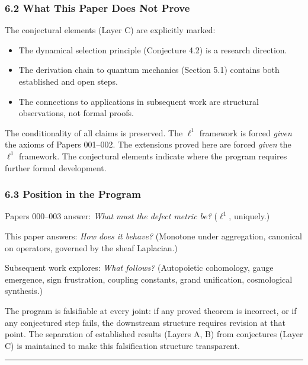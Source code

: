 \documentclass[
]{article}
\providecommand{\tightlist}{%
  \setlength{\itemsep}{0pt}\setlength{\parskip}{0pt}}
\begin{document}
\subsubsection{6.2 What This Paper Does Not
Prove}\label{what-this-paper-does-not-prove}

The conjectural elements (Layer C) are explicitly marked:

\begin{itemize}
\tightlist
\item
  The dynamical selection principle (Conjecture 4.2) is a research
  direction.
\item
  The derivation chain to quantum mechanics (Section 5.1) contains both
  established and open steps.
\item
  The connections to applications in subsequent work are structural
  observations, not formal proofs.
\end{itemize}

The conditionality of all claims is preserved. The \(\ell^1\) framework
is forced \emph{given} the axioms of Papers 001--002. The extensions
proved here are forced \emph{given} the \(\ell^1\) framework. The
conjectural elements indicate where the program requires further formal
development.

\subsubsection{6.3 Position in the
Program}\label{position-in-the-program}

Papers 000--003 answer: \emph{What must the defect metric be?}
(\(\ell^1\), uniquely.)

This paper answers: \emph{How does it behave?} (Monotone under
aggregation, canonical on operators, governed by the sheaf Laplacian.)

Subsequent work explores: \emph{What follows?} (Autopoietic cohomology,
gauge emergence, sign frustration, coupling constants, grand
unification, cosmological synthesis.)

The program is falsifiable at every joint: if any proved theorem is
incorrect, or if any conjectured step fails, the downstream structure
requires revision at that point. The separation of established results
(Layers A, B) from conjectures (Layer C) is maintained to make this
falsification structure transparent.

\begin{center}\rule{0.5\linewidth}{0.5pt}\end{center}
\end{document}
